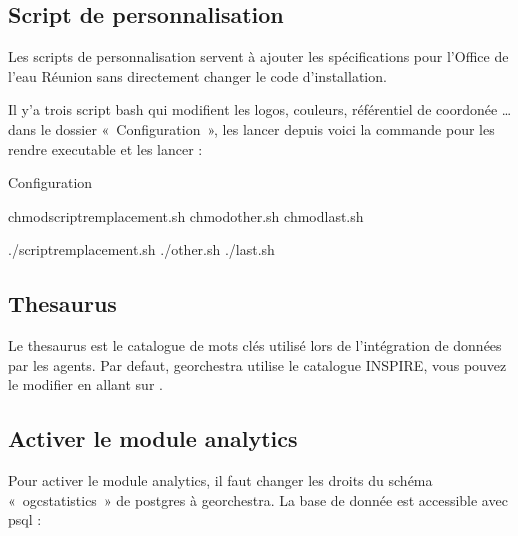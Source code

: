 \documentclass[letterpaper,10pt,french]{sphinxmanual}
\begin{document}
\subsection{Script de personnalisation}
\label{\detokenize{doc_instal/installation:script-de-personnalisation}}
\sphinxAtStartPar
Les scripts de personnalisation servent à ajouter les spécifications pour l’Office de l’eau Réunion sans directement changer le code d’installation.

\sphinxAtStartPar
Il y’a trois script bash qui modifient les logos, couleurs, référentiel de coordonée … dans le dossier « Configuration », les lancer depuis 
voici la commande pour les rendre executable et les lancer :

\begin{sphinxVerbatim}[commandchars=\\\{\}]
Configuration
\end{sphinxVerbatim}

\begin{sphinxVerbatim}[commandchars=\\\{\}]
chmodscript\PYGZus{}remplacement.sh
chmodother.sh
chmodlast.sh
\end{sphinxVerbatim}

\begin{sphinxVerbatim}[commandchars=\\\{\}]
./script\PYGZus{}remplacement.sh
./other.sh
./last.sh
\end{sphinxVerbatim}


\subsection{Thesaurus}
\label{\detokenize{doc_instal/installation:thesaurus}}
\sphinxAtStartPar
Le thesaurus est le catalogue de mots clés utilisé lors de l’intégration de données par les agents.
Par defaut, georchestra utilise le catalogue INSPIRE, vous pouvez le modifier en allant sur {\hyperref[\detokenize{doc_admin/catalogue:id1}]{}}.


\subsection{Activer le module analytics}
\label{\detokenize{doc_instal/installation:activer-le-module-analytics}}
\sphinxAtStartPar
Pour activer le module analytics, il faut changer les droits du schéma « ogcstatistics » de postgres à georchestra.
La base de donnée est accessible avec psql :
\end{document}
